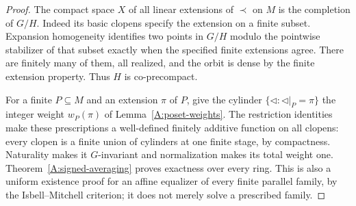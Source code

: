 \begin{proof}
The compact space $X$ of all linear extensions of $\prec$ on $M$
is the completion of $G/H$. Indeed its basic clopens specify the
extension on a finite subset. Expansion homogeneity identifies
two points in $G/H$ modulo the pointwise stabilizer of that subset
exactly when the specified finite extensions agree. There are
finitely many of them, all realized, and the orbit is dense by
the finite extension property. Thus $H$ is co-precompact.

For a finite $P\subseteq M$ and an extension $\pi$ of $P$, give
the cylinder $\{\triangleleft:\triangleleft|_P=\pi\}$ the integer
weight $w_P(\pi)$ of Lemma~\ref{A:poset-weights}. The restriction
identities make these prescriptions a well-defined finitely
additive function on all clopens: every clopen is a finite union
of cylinders at one finite stage, by compactness. Naturality makes
it $G$-invariant and normalization makes its total weight one.
Theorem~\ref{A:signed-averaging} proves exactness over every ring.
This is also a uniform existence proof for an affine equalizer of
every finite parallel family, by the Isbell--Mitchell criterion;
it does not merely solve a prescribed family.


\end{proof}
